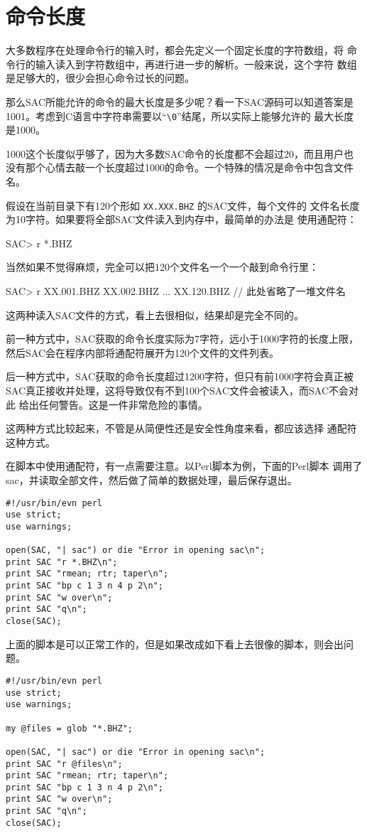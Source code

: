 \section{命令长度}
大多数程序在处理命令行的输入时，都会先定义一个固定长度的字符数组，将
命令行的输入读入到字符数组中，再进行进一步的解析。一般来说，这个字符
数组是足够大的，很少会担心命令过长的问题。

那么SAC所能允许的命令的最大长度是多少呢？看一下SAC源码可以知道答案是
1001。考虑到C语言中字符串需要以``\verb|\0|''结尾，所以实际上能够允许的
最大长度是1000。

1000这个长度似乎够了，因为大多数SAC命令的长度都不会超过20，而且用户也
没有那个心情去敲一个长度超过1000的命令。一个特殊的情况是命令中包含文件名。

假设在当前目录下有120个形如 \texttt{XX.XXX.BHZ} 的SAC文件，每个文件的
文件名长度为10字符。如果要将全部SAC文件读入到内存中，最简单的办法是
使用通配符：
\begin{SACCode}
SAC> r *.BHZ
\end{SACCode}
当然如果不觉得麻烦，完全可以把120个文件名一个一个敲到命令行里：
\begin{SACCode}
SAC> r XX.001.BHZ XX.002.BHZ ... XX.120.BHZ // 此处省略了一堆文件名
\end{SACCode}

这两种读入SAC文件的方式，看上去很相似，结果却是完全不同的。

前一种方式中，SAC获取的命令长度实际为7字符，远小于1000字符的长度上限，
然后SAC会在程序内部将通配符展开为120个文件的文件列表。

后一种方式中，SAC获取的命令长度超过1200字符，但只有前1000字符会真正被
SAC真正接收并处理，这将导致仅有不到100个SAC文件会被读入，而SAC不会对此
给出任何警告。这是一件非常危险的事情。

这两种方式比较起来，不管是从简便性还是安全性角度来看，都应该选择
通配符这种方式。

在脚本中使用通配符，有一点需要注意。以Perl脚本为例，下面的Perl脚本
调用了sac，并读取全部文件，然后做了简单的数据处理，最后保存退出。

\begin{verbatim}
#!/usr/bin/evn perl
use strict;
use warnings;

open(SAC, "| sac") or die "Error in opening sac\n";
print SAC "r *.BHZ\n";
print SAC "rmean; rtr; taper\n";
print SAC "bp c 1 3 n 4 p 2\n";
print SAC "w over\n";
print SAC "q\n";
close(SAC);
\end{verbatim}

上面的脚本是可以正常工作的，但是如果改成如下看上去很像的脚本，则会出问题。
\begin{verbatim}
#!/usr/bin/evn perl
use strict;
use warnings;

my @files = glob "*.BHZ";

open(SAC, "| sac") or die "Error in opening sac\n";
print SAC "r @files\n";
print SAC "rmean; rtr; taper\n";
print SAC "bp c 1 3 n 4 p 2\n";
print SAC "w over\n";
print SAC "q\n";
close(SAC);
\end{verbatim}

